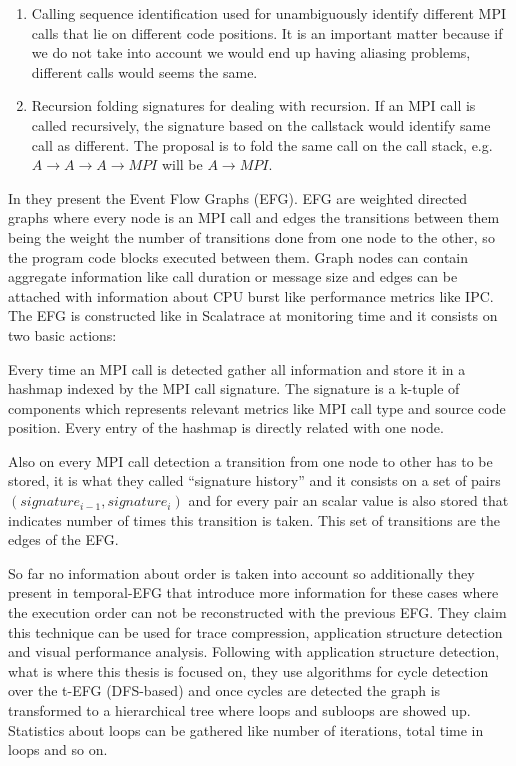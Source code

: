 \begin{enumerate}[label=\roman*)]
  \item Calling sequence identification used for unambiguously identify
    different MPI calls that lie on different code positions. It is an important
    matter because if we do not take into account we would end up having aliasing
    problems, different calls would seems the same. 
  \item Recursion folding signatures for dealing with recursion. If an MPI call 
    is called recursively, the signature based on the callstack would identify
    same call as different. The proposal is to fold the same call on the call
    stack, e.g. $A\rightarrow A \rightarrow A \rightarrow MPI$ will be $A
    \rightarrow MPI$.
\end{enumerate}


In \cite{aguilar2014mpi} they present the Event Flow Graphs (EFG). EFG are
weighted directed graphs where every node is an MPI call and edges the
transitions between them being the weight the number of transitions done
from one node to the other, so the program code blocks executed between them.
Graph nodes can contain aggregate information like call duration or message size
and edges can be attached with information about CPU burst like performance
metrics like IPC. 
The EFG is constructed like in Scalatrace at monitoring time and it consists on
two basic actions: 
\begin{enumerate*}[label=\roman*)]
  \item Every time an MPI call is detected gather all information and store it
    in a hashmap indexed by the MPI call signature. The signature is a k-tuple
    of components which represents relevant metrics like MPI call type and
    source code position. Every entry of the hashmap is directly related with
    one node.
  \item Also on every MPI call detection a transition from one node to other has
    to be stored, it is what they called ``signature history'' and it consists
    on a set of pairs $(signature_{i-1}, signature_{i})$ and for every pair an
    scalar value is also stored that indicates number of times this transition
    is taken. This set of transitions are the edges of the EFG.
\end{enumerate*}

So far no information about order is taken into account
so additionally they present in \cite{aguilar2016event} temporal-EFG that 
introduce more
information for these cases where the execution order can not be reconstructed
with the previous EFG. They claim this technique can be used for trace
compression, application structure detection and visual performance analysis.
Following with application structure detection, what is where this thesis is
focused on, they use algorithms for cycle detection over the t-EFG (DFS-based)
and once cycles are detected the graph is transformed to a hierarchical tree
where loops and subloops are showed up. Statistics about loops can be gathered
like number of iterations, total time in loops and so on.


